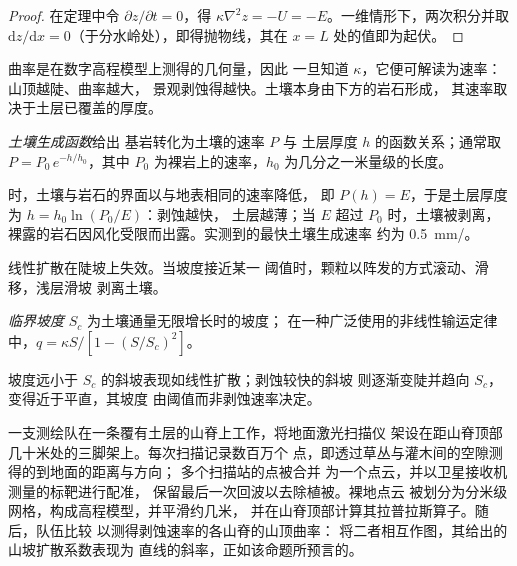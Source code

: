 \begin{proof}
在定理中令 $\partial z/\partial t = 0$，得 $\kappa\nabla^2 z =
-U = -E$。一维情形下，两次积分并取 $\mathrm{d}z/\mathrm{d}x =
0$（于分水岭处），即得抛物线，其在 $x = L$ 处的值即为起伏。
\end{proof}

曲率是在数字高程模型上测得的几何量，因此
一旦知道 $\kappa$，它便可解读为速率：山顶越陡、曲率越大，
景观剥蚀得越快。土壤本身由下方的岩石形成，
其速率取决于土层已覆盖的厚度。

\begin{definition}[土壤生成函数]\label{def:b3:quantitative-geomorphology:soil-production}
\emph{土壤生成函数}给出
基岩转化为土壤的速率 $P$ 与
土层厚度 $h$ 的函数关系；通常取 $P = P_0\,e^{-h/h_0}$，其中
$P_0$ 为裸岩上的速率，$h_0$ 为几分之一米量级的长度。
\end{definition}

时，土壤与岩石的界面以与地表相同的速率降低，
即 $P(h) = E$，于是土层厚度为 $h = h_0 \ln(P_0/E)$：剥蚀越快，
土层越薄；当 $E$ 超过 $P_0$ 时，土壤被剥离，
裸露的岩石因风化受限而出露。实测到的最快土壤生成速率
约为 \qty{0.5}{mm/}。

线性扩散在陡坡上失效。当坡度接近某一
阈值时，颗粒以阵发的方式滚动、滑移，浅层滑坡
剥离土壤。

\begin{definition}[临界坡度]\label{def:b3:quantitative-geomorphology:critical}
\emph{临界坡度}
$S_c$ 为土壤通量无限增长时的坡度；
在一种广泛使用的非线性输运定律中，$q = \kappa S/[1 - (S/S_c)^2]$。
\end{definition}

坡度远小于 $S_c$ 的斜坡表现如线性扩散；剥蚀较快的斜坡
则逐渐变陡并趋向 $S_c$，变得近于平直，其坡度
由阈值而非剥蚀速率决定。

\begin{inthefield}[扫描山坡]
一支测绘队在一条覆有土层的山脊上工作，将地面激光扫描仪
架设在距山脊顶部几十米处的三脚架上。每次扫描记录数百万个
点，即透过草丛与灌木间的空隙测得的到地面的距离与方向；
多个扫描站的点被合并
为一个点云，并以卫星接收机测量的标靶进行配准，
保留最后一次回波以去除植被。裸地点云
被划分为分米级网格，构成高程模型，并平滑约几米，
并在山脊顶部计算其拉普拉斯算子。随后，队伍比较
以测得剥蚀速率的各山脊的山顶曲率：
将二者相互作图，其给出的山坡扩散系数表现为
直线的斜率，正如该命题所预言的。
\end{inthefield}

